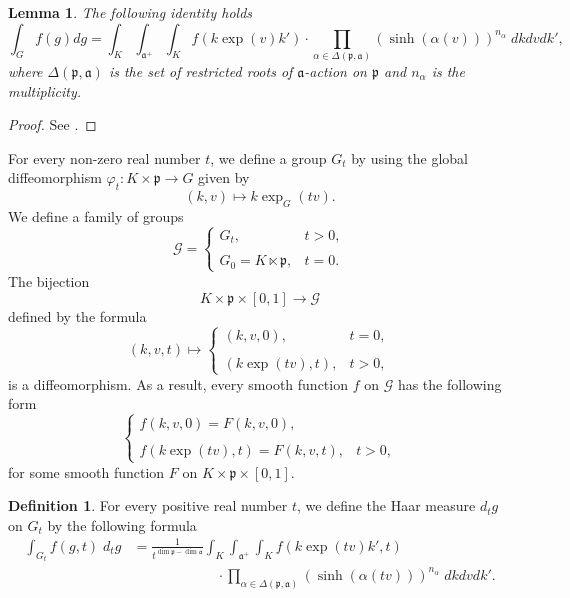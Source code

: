 \documentclass{amsproc}
\newtheorem{lemma}[theorem]{Lemma}
\theoremstyle{definition}
\newtheorem{definition}[theorem]{Definition}
\theoremstyle{remark}
\numberwithin{equation}{section}
\newcommand{\ka}{\mathfrak{a}}
\newcommand{\kp}{\mathfrak{p}}
\begin{document}
\begin{lemma}
The following identity holds
\[
\int_G f(g) dg = \int_K \int_{\ka^+} \int_K f\left(k\exp(v)k'\right) \cdot \prod_{\alpha \in \Delta(\kp, \ka)} \left(\sinh(\alpha(v))\right)^{n_\alpha}\; dk dvdk',
\]	
where $\Delta(\kp, \ka)$ is the set of restricted roots of $\ka$-action on $\kp$ and $n_\alpha$ is the multiplicity. 
\end{lemma}
\begin{proof}
See \cite[Proposition 5. 28]{kanpp-book}. 	
\end{proof}





For every non-zero real number $t$, we define a group $G_t$ by using the global diffeomorphism $\varphi_t \colon K \times \kp \to G$ given by 
\[
(k,v) \mapsto k \exp_G(tv).
\]
We define a family of groups 
\[
\mathcal{G} = \begin{cases}
 G_t, & t > 0,\\
 &\\
 G_0 = K \ltimes \kp, & t = 0.
 \end{cases}
\]
The bijection
\[
K \times \kp \times [0, 1] \to \mathcal{G}
\]
defined by the formula
\[
(k, v, t) \mapsto \begin{cases}
(k, v, 0), & t = 0,\\
 &\\
\left(k\exp(tv), t \right), & t > 0, 
 \end{cases}
\]
is a diffeomorphism. As a result, every smooth function $f$ on $\mathcal{G}$ has the following form
\[
\begin{cases}
f(k, v, 0) = F(k, v, 0),\\
 &\\
f(k\exp(tv), t) = F(k, v, t), & t > 0, 
 \end{cases}
\]
for some smooth function $F$ on $K \times \kp \times [0, 1]$. 

\begin{definition}\label{defn:haar-measure-t}
For every positive real number $t$, we define the Haar measure $d_t g$ on $G_t$ by the following formula	
\[
\begin{aligned}
\int_{G_t} f(g, t) \; d_t g &= \frac{1}{t^{\dim \kp - \dim \ka}}\int_K \int_{\ka^+} \int_K f\left(k\exp(tv)k', t\right)\\
&\qquad \qquad \qquad\cdot \prod_{\alpha \in \Delta(\kp, \ka)} \left(\sinh(\alpha(tv))\right)^{n_\alpha}\; dk dvdk'.
\end{aligned}
\]
\end{definition}
\end{document}

